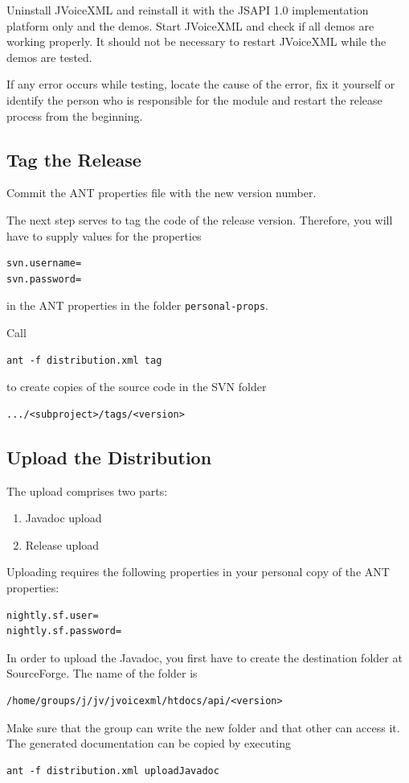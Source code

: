 \documentclass[11pt,a4paper]{article}
\begin{document}
Uninstall JVoiceXML and reinstall it with the JSAPI 1.0 implementation platform
only and the demos. Start JVoiceXML and check if all demos are working properly.
It should not be necessary to restart JVoiceXML while the demos are tested.

If any error occurs while testing, locate the cause of the error, fix it
yourself or identify the person who is responsible for the module and restart
the release process from the beginning.

\subsection{Tag the Release}

Commit the ANT properties file with the new version number.

The next step serves to tag the code of the release version. Therefore, you
will have to supply values for the properties
\begin{lstlisting}
svn.username=
svn.password=
\end{lstlisting}
in the ANT properties in the folder \texttt{personal-props}.

Call
\begin{lstlisting}
ant -f distribution.xml tag
\end{lstlisting}
to create copies of the source code in the SVN folder
\begin{lstlisting}
.../<subproject>/tags/<version>
\end{lstlisting}

\subsection{Upload the Distribution}

The upload comprises two parts:
\begin{enumerate}
  \item Javadoc upload
  \item Release upload
\end{enumerate}

Uploading requires the following properties in your personal copy of the ANT
properties:
\begin{lstlisting}
nightly.sf.user=
nightly.sf.password=
\end{lstlisting}

In order to upload the Javadoc, you first have to create the
destination folder at SourceForge. The name of the folder is
\begin{lstlisting}
/home/groups/j/jv/jvoicexml/htdocs/api/<version>
\end{lstlisting}
Make sure that the group can write the new folder and that other can access it.
The generated documentation can be copied by executing
\begin{lstlisting}
ant -f distribution.xml uploadJavadoc
\end{lstlisting}
\end{document}

